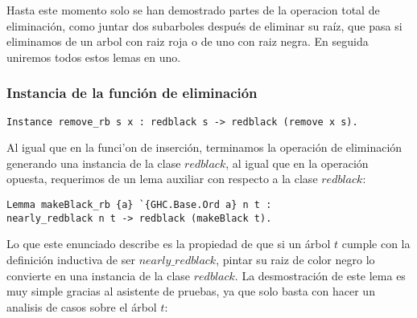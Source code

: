 Hasta este momento solo se han demostrado partes de la operacion total de eliminación, como juntar
dos subarboles despu\'es de eliminar su ra\'iz, que pasa si eliminamos de un arbol con raiz roja o
de uno con raiz negra. En seguida uniremos todos estos lemas en uno.

\subsubsection{Instancia de la funci\'on de eliminaci\'on}
\begin{verbatim}
Instance remove_rb s x : redblack s -> redblack (remove x s).
\end{verbatim}

Al igual que en la funci'on de inserción, terminamos la operación de eliminaci\'on generando una
instancia de la clase $redblack$, al igual que en la operación opuesta, requerimos de un lema
auxiliar con respecto a la clase $redblack$:

\begin{verbatim}
Lemma makeBlack_rb {a} `{GHC.Base.Ord a} n t :
nearly_redblack n t -> redblack (makeBlack t).
\end{verbatim}

Lo que este enunciado describe es la propiedad de que si un \'arbol $t$ cumple con la definici\'on
inductiva de ser $nearly\_redblack$, pintar su raiz de color negro lo convierte en una instancia de
la clase $redblack$. La desmostraci\'on de este lema es muy simple gracias al asistente de pruebas,
ya que solo basta con hacer un analisis de casos sobre el \'arbol $t$:

